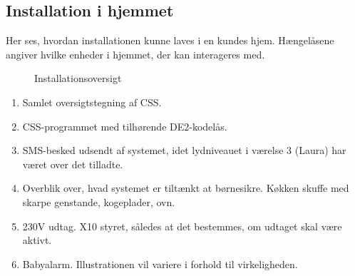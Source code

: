 \subsection*{Installation i hjemmet}

Her ses, hvordan installationen kunne laves i en kundes hjem. Hængelåsene angiver hvilke enheder i hjemmet, der kan interageres med.

\begin{figure}[H] \centering
{}
\caption{Installationsoversigt}
\label{fig:installationsoversigt}
\end{figure}

\begin{enumerate}
\item Samlet oversigtstegning af CSS. 
\item CSS-programmet med tilhørende DE2-kodelås.
\item SMS-besked udsendt af systemet, idet lydniveauet i værelse 3 (Laura) har været over det tilladte.
\item Overblik over, hvad systemet er tiltænkt at børnesikre. Køkken skuffe med skarpe genstande, kogeplader, ovn.
\item 230V udtag. X10 styret, således at det bestemmes, om udtaget skal være aktivt.
\item Babyalarm. Illustrationen vil variere i forhold til virkeligheden.
\end{enumerate}